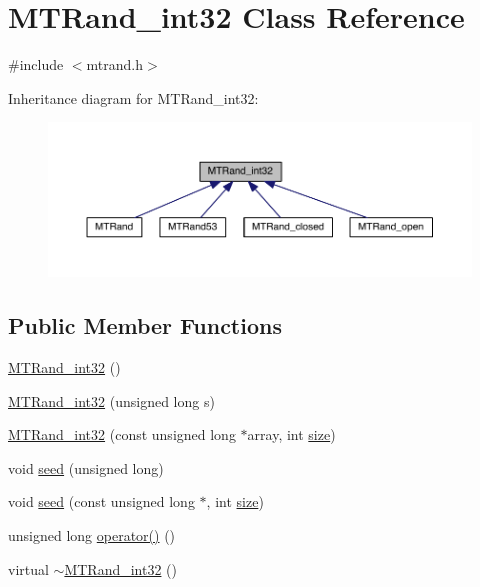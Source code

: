 \hypertarget{a00019}{\section{M\-T\-Rand\-\_\-int32 Class Reference}
\label{a00019}
}


{\ttfamily \#include $<$mtrand.\-h$>$}



Inheritance diagram for M\-T\-Rand\-\_\-int32\-:\nopagebreak
\begin{figure}[H]
\begin{center}
\leavevmode
\includegraphics[width=350pt]{a00160}
\end{center}
\end{figure}
\subsection*{Public Member Functions}
\begin{DoxyCompactItemize}
\item 
\hyperlink{a00019_a034f223c086f5368bd220b02f2cc12a8}{M\-T\-Rand\-\_\-int32} ()
\item 
\hyperlink{a00019_ad30f7c63a6f1fb3c3b76b8ce6ffa0206}{M\-T\-Rand\-\_\-int32} (unsigned long s)
\item 
\hyperlink{a00019_a19acddb3910a7282517b2ffc398b92b4}{M\-T\-Rand\-\_\-int32} (const unsigned long $\ast$array, int \hyperlink{a00062_ae113ea7f9e515a12ac4b5595c6faf61e}{size})
\item 
void \hyperlink{a00019_a0c57076fe30358e0700a7ce1baa0ea27}{seed} (unsigned long)
\item 
void \hyperlink{a00019_a3cabc1e3445716236a570ffd2f69686d}{seed} (const unsigned long $\ast$, int \hyperlink{a00062_ae113ea7f9e515a12ac4b5595c6faf61e}{size})
\item 
unsigned long \hyperlink{a00019_ad7fe22190d0411c6dac8e6f471633aa4}{operator()} ()
\item 
virtual \hyperlink{a00019_a364900abea0758d070ce89922159923a}{$\sim$\-M\-T\-Rand\-\_\-int32} ()
\end{DoxyCompactItemize}
